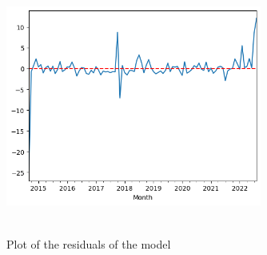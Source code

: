 \documentclass[11pt]{article}
\begin{document}
\begin{figure}[h]
    \caption{Plot of the residuals of the model}
    \centering
    \includegraphics[width = 0.75\textwidth,height = 3in]{resid.png}
    \label{resid}
\end{figure}
\end{document}

